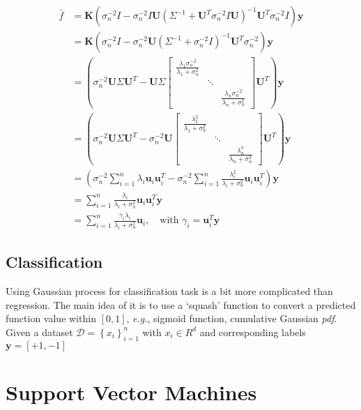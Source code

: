 \documentclass{article}
\newcommand{\eg}{\emph{e.g.}}
\newcommand{\vct}[1]{\ensuremath{\boldsymbol{#1}}} %
\newcommand{\set}[1]{\ensuremath{\mathcal{#1}}}
\newcommand{\bmat}[1]{\begin{bmatrix}#1\end{bmatrix}}
\begin{document}
\begin{align*}
\bar{f} & = \vct K\left( \sigma_n^{-2}I - \sigma_n^{-2}I\vct U \left( \Sigma^{-1}+\vct U^T\sigma_n^{-2}I\vct U \right)^{-1}\vct U^T\sigma_n^{-2}I\right)\vct y \\
& = \vct K\left( \sigma_n^{-2}I - \sigma_n^{-2}\vct U \left( \Sigma^{-1}+\sigma_n^{-2}I \right)^{-1}\vct U^T\sigma_n^{-2}\right)\vct y \\
& = \left( \sigma_n^{-2}\vct U\Sigma\vct U^T - \vct U\Sigma
			\bmat{\frac{\lambda_1\sigma_n^{-2}}{\lambda_1+\sigma_n^{2}} & & \\ 
						& \ddots & \\ 
						& & \frac{\lambda_n\sigma_n^{-2}}{\lambda_n+\sigma_n^{2}}}
		\vct U^T \right)\vct y \\
& = \left( \sigma_n^{-2}\vct U\Sigma\vct U^T - \sigma_n^{-2}\vct U
\bmat{\frac{\lambda_1^2}{\lambda_1+\sigma_n^{2}} & & \\ 
	& \ddots & \\ 
	& & \frac{\lambda_n^2}{\lambda_n+\sigma_n^{2}}}
\vct U^T \right)\vct y \\
& = \left( \sigma_n^{-2}\sum_{i=1}^n\lambda_i\vct u_i\vct u_i^T - \sigma_n^{-2}\sum_{i=1}^n \frac{\lambda_i^{2}}{\lambda_i + \sigma_n^2}\vct u_i\vct u_i^T \right)\vct y \\
& = \sum_{i=1}^n \frac{\lambda_i}{\lambda_i + \sigma_n^2}\vct u_i\vct u_i^T\vct y \\
& = \sum_{i=1}^n \frac{\gamma_i\lambda_i}{\lambda_i + \sigma_n^2}\vct u_i, \quad \text{with } \gamma_i = \vct u_i^T\vct y
\end{align*}

\subsection{Classification}
Using Gaussian process for classification task is a bit more complicated than regression. The main idea of it is to use a `squash' function to convert a predicted function value within $\left[ 0, 1\right]$, \eg, sigmoid function, cumulative Gaussian \textit{pdf}. Given a dataset $\set D = \left\{x_i\right\}_{i=1}^n$ with $x_i \in R^d$ and corresponding labels $\vct y=\left[ +1,-1 \right] $

\section{Support Vector Machines}
\end{document}

